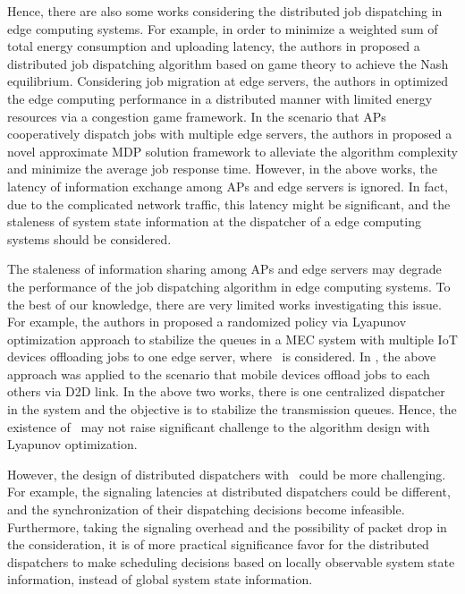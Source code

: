 Hence, there are also some works considering the distributed job dispatching in edge computing systems.
For example, in order to minimize a weighted sum of total energy consumption and uploading latency, the authors in \cite{ToN-Xuchen2016} proposed a distributed job dispatching algorithm based on game theory to achieve the Nash equilibrium. 
Considering job migration at edge servers, the authors in \cite{ToN-xujie2018} optimized the edge computing performance in a distributed manner with limited energy resources via a congestion game framework.
In the scenario that APs cooperatively dispatch jobs with multiple edge servers, the authors in \cite{mdp-jcin} proposed a novel approximate MDP solution framework to alleviate the algorithm complexity and minimize the average job response time.
However, in the above works, the latency of information exchange among APs and edge servers is ignored.
In fact, due to the complicated network traffic, this latency might be significant, and the staleness of system state information at the dispatcher of a edge computing systems should be considered.

The staleness of information sharing among APs and edge servers may degrade the performance of the job dispatching algorithm in edge computing systems.
To the best of our knowledge, there are very limited works investigating this issue.
For example, the authors in \cite{JSAC17-LyuX} proposed a randomized policy via Lyapunov optimization approach to stabilize the queues in a MEC system with multiple IoT devices offloading jobs to one edge server, where \brlatency~is considered. 
In \cite{TWC18-LyuX}, the above approach was applied to the scenario that mobile devices offload jobs to each others via D2D link.
In the above two works, there is one centralized dispatcher in the system and the objective is to stabilize the transmission queues.
Hence, the existence of \brlatency~may not raise significant challenge to the algorithm design with Lyapunov optimization.

However, the design of distributed dispatchers with \brlatency~could be more challenging.
For example, the signaling latencies at distributed dispatchers could be different, and the synchronization of their dispatching decisions become infeasible.
Furthermore, taking the signaling overhead and the possibility of packet drop in the consideration, it is of more practical significance favor for the distributed dispatchers to make scheduling decisions based on locally observable system state information, instead of global system state information.
